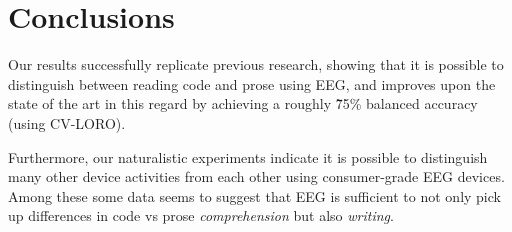 \chapter{Conclusions}

Our results successfully replicate previous research, showing that it is possible to distinguish between reading code and prose using EEG, and improves upon the state of the art in this regard by achieving a roughly \~75\% balanced accuracy (using CV-LORO).

Furthermore, our naturalistic experiments indicate it is possible to distinguish many other device activities from each other using consumer-grade EEG devices. Among these some data seems to suggest that EEG is sufficient to not only pick up differences in code vs prose \emph{comprehension} but also \emph{writing}.
